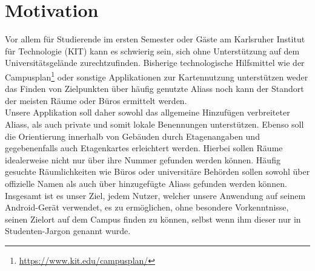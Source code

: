 \chapter{Motivation}

Vor allem für Studierende im ersten Semester oder Gäste am Karlsruher Institut für Technologie (KIT) kann es schwierig sein, 
sich ohne Unterstützung auf dem Universitätsgelände zurechtzufinden. 
Bisherige technologische Hilfsmittel wie der \dq Campusplan\dq{}\footnote{\href{https://www.kit.edu/campusplan/}{https://www.kit.edu/campusplan/}} oder sonstige Applikationen 
zur Kartennutzung unterstützen weder das Finden von Zielpunkten über häufig genutzte \Glspl{Alias} noch kann der Standort der meisten Räume oder Büros ermittelt werden.\\
Unsere Applikation soll daher sowohl das allgemeine Hinzufügen verbreiteter \Glspl{Alias}, als auch private und somit \gls{lokal}e Benennungen unterstützen.
Ebenso soll die Orientierung innerhalb von Gebäuden durch Etagenangaben und gegebenenfalls auch 
\Glspl{Etagenkarte} erleichtert werden. Hierbei sollen Räume idealerweise nicht nur über ihre Nummer gefunden werden können.
Häufig gesuchte Räumlichkeiten wie Büros oder universitäre Behörden sollen sowohl über offizielle Namen als auch 
über hinzugefügte \Glspl{Alias} gefunden werden können.\\
Insgesamt ist es unser Ziel, jedem Nutzer, welcher unsere Anwendung auf seinem \Gls{Android}-Gerät verwendet, es zu ermöglichen, 
ohne besondere Vorkenntnisse, seinen Zielort auf dem \Gls{Campus} finden zu können, selbst wenn ihm dieser nur in \dq Studenten-Jargon\dq{} genannt wurde. 